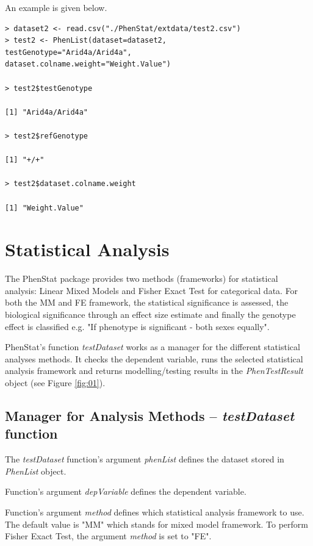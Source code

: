 \documentclass[12pt,a4paper]{article}
\begin{document}
An example is given below.
\begingroup
    \fontsize{8pt}{12pt}\selectfont
\begin{verbatim}
> dataset2 <- read.csv("./PhenStat/extdata/test2.csv")
> test2 <- PhenList(dataset=dataset2,
testGenotype="Arid4a/Arid4a",
dataset.colname.weight="Weight.Value")

> test2$testGenotype

[1] "Arid4a/Arid4a"

> test2$refGenotype

[1] "+/+"

> test2$dataset.colname.weight

[1] "Weight.Value"
\end{verbatim}
\endgroup

\section{Statistical Analysis}
The PhenStat package provides two methods (frameworks) for statistical analysis: Linear Mixed Models and Fisher Exact Test for categorical data. For both the MM and FE framework, 
the statistical significance is assessed, the biological significance through an effect size estimate and finally the genotype effect is classified e.g. "If phenotype is significant - both sexes equally".  


PhenStat's function \textit{testDataset} works as a manager for the different statistical analyses methods. It checks the dependent variable, runs the selected statistical analysis framework and
 returns modelling\slash testing results in the \textit{PhenTestResult} object (see Figure \ref{fig:01}). 

\subsection{Manager for Analysis Methods -- \textit{testDataset} function}
The \textit{testDataset} function's argument \textit{phenList} defines the dataset stored in \textit{PhenList} object.

Function's argument \textit{depVariable} defines the dependent variable.

Function's argument \textit{method} defines which statistical analysis framework to use. 
The default value is "MM" which stands for mixed model framework. To perform Fisher Exact Test, the argument \textit{method} is set to "FE". 
\end{document}
